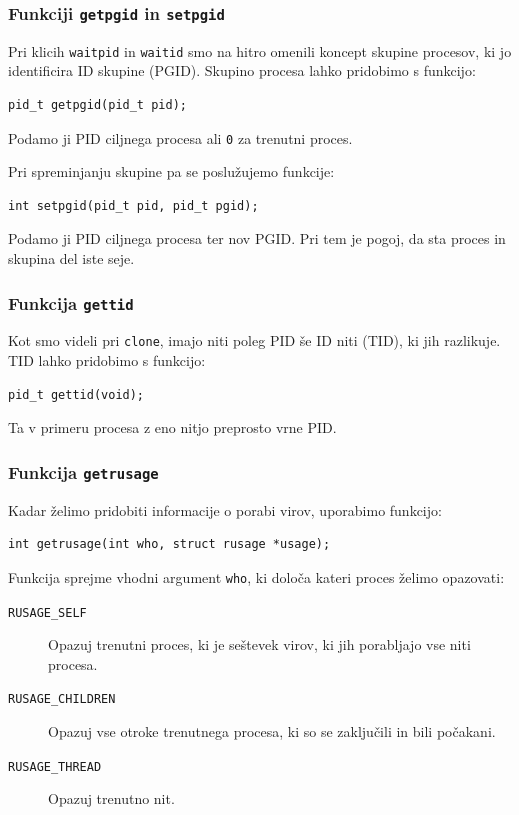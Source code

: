 \documentclass[a4paper,12pt,openright]{book}
\begin{document}
\subsubsection{Funkciji \texttt{getpgid} in \texttt{setpgid}}

Pri klicih \texttt{waitpid} in \texttt{waitid} smo na hitro omenili koncept skupine procesov, ki jo identificira ID skupine (PGID).
Skupino procesa lahko pridobimo s funkcijo:
\begin{lstlisting}[style=func]
 pid_t getpgid(pid_t pid);
\end{lstlisting}
Podamo ji PID ciljnega procesa ali \texttt{0} za trenutni proces.

Pri spreminjanju skupine pa se poslužujemo funkcije:
\begin{lstlisting}[style=func]
 int setpgid(pid_t pid, pid_t pgid);
\end{lstlisting}
Podamo ji PID ciljnega procesa ter nov PGID.
Pri tem je pogoj, da sta proces in skupina del iste seje.

\subsubsection{Funkcija \texttt{gettid}}

Kot smo videli pri \texttt{clone}, imajo niti poleg PID še ID niti (TID), ki jih razlikuje.
TID lahko pridobimo s funkcijo:
\begin{lstlisting}[style=func]
 pid_t gettid(void);
\end{lstlisting}
Ta v primeru procesa z eno nitjo preprosto vrne PID.

\subsubsection{Funkcija \texttt{getrusage}}

Kadar želimo pridobiti informacije o porabi virov, uporabimo funkcijo:
\begin{lstlisting}[style=func]
 int getrusage(int who, struct rusage *usage);
\end{lstlisting}

Funkcija sprejme vhodni argument \texttt{who}, ki določa kateri proces želimo opazovati:
\begin{description}
	\item[\texttt{RUSAGE\_SELF}] Opazuj trenutni proces, ki je seštevek virov, ki jih porabljajo vse niti procesa.
	\item[\texttt{RUSAGE\_CHILDREN}] Opazuj vse otroke trenutnega procesa, ki so se zaključili in bili počakani.
	\item[\texttt{RUSAGE\_THREAD}] Opazuj trenutno nit.
\end{description}
\end{document}
